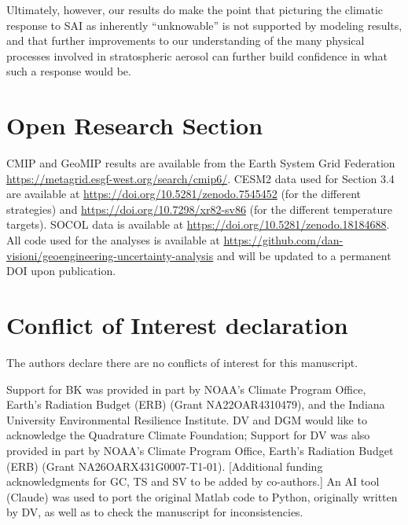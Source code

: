 \documentclass[draft]{agujournal2019}
\begin{document}
Ultimately, however, our results do make the point that picturing the climatic response to SAI as inherently ``unknowable'' is not supported by modeling results, and that further improvements to our understanding of the many physical processes involved in stratospheric aerosol can further build confidence in what such a response would be.






\section*{Open Research Section}
CMIP and GeoMIP results are available from the Earth System Grid Federation \url{https://metagrid.esgf-west.org/search/cmip6/}. CESM2 data used for Section 3.4 are available at \url{https://doi.org/10.5281/zenodo.7545452} (for the different strategies) and \url{https://doi.org/10.7298/xr82-sv86} (for the different temperature targets). SOCOL data is available at \url{https://doi.org/10.5281/zenodo.18184688}. All code used for the analyses is available at \url{https://github.com/dan-visioni/geoengineering-uncertainty-analysis} and will be updated to a permanent DOI upon publication.

\section*{Conflict of Interest declaration}
The authors declare there are no conflicts of interest for this manuscript.

\acknowledgments
Support for BK was provided in part by NOAA's Climate Program Office, Earth's Radiation Budget (ERB) (Grant NA22OAR4310479), and the Indiana University Environmental Resilience Institute. DV and DGM would like to acknowledge the Quadrature Climate Foundation; Support for DV was also provided in part by NOAA's Climate Program Office, Earth's Radiation Budget (ERB) (Grant NA26OARX431G0007-T1-01). [Additional funding acknowledgments for GC, TS and SV to be added by co-authors.] An AI tool (Claude) was used to port the original Matlab code to Python, originally written by DV, as well as to check the manuscript for inconsistencies.



\end{document}
